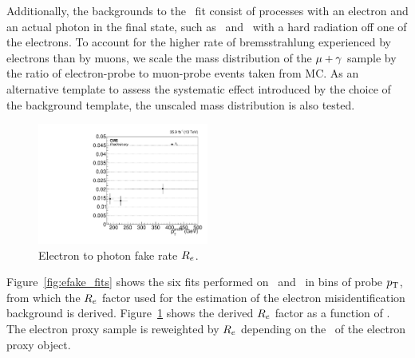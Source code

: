Additionally, the backgrounds to the \Pe\Pgg\ fit consist of processes with an electron and an actual photon in the final state, such as \PW\Pgg\ and \Zee\ with a hard radiation off one of the electrons.
To account for the higher rate of bremsstrahlung experienced by electrons than by muons, we scale the mass distribution of the ${\mu}+\gamma$ sample by the ratio of electron-probe to muon-probe events taken from MC.
As an alternative template to assess the systematic effect introduced by the choice of the background template, the unscaled mass distribution is also tested.

\begin{figure}[htbp]
\centering
    \includegraphics[width=0.5\textwidth]{Analysis/Figures/frate_data_ptalt.pdf} 
    \caption{
      Electron to photon fake rate $R_{{e}}$.
    }
    \label{fig:efake_frate}
\end{figure}


Figure~\ref{fig:efake_fits} shows the six fits performed on \Pe\Pe\ and \Pe\Pgg\ in bins of probe $p_{\mathrm{T}}$, from which the $R_{{e}}$ factor used for the estimation of the electron misidentification background is derived.
Figure~\ref{fig:efake_frate} shows the derived $R_{{e}}$ factor as a function of \ETg. 
The electron proxy sample is reweighted by $R_{{e}}$ depending on the \pt\ of the electron proxy object.

